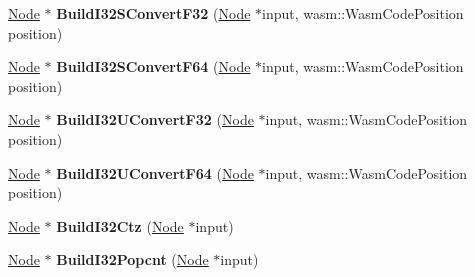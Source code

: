 \begin{DoxyCompactItemize}
\item 
\hyperlink{classv8_1_1internal_1_1compiler_1_1_node}{Node} $\ast$ {\bfseries Build\+I32\+S\+Convert\+F32} (\hyperlink{classv8_1_1internal_1_1compiler_1_1_node}{Node} $\ast$input, wasm\+::\+Wasm\+Code\+Position position)\hypertarget{classv8_1_1internal_1_1compiler_1_1_wasm_graph_builder_a4e6c3475936a02b113294ae82c132f31}{}\label{classv8_1_1internal_1_1compiler_1_1_wasm_graph_builder_a4e6c3475936a02b113294ae82c132f31}

\item 
\hyperlink{classv8_1_1internal_1_1compiler_1_1_node}{Node} $\ast$ {\bfseries Build\+I32\+S\+Convert\+F64} (\hyperlink{classv8_1_1internal_1_1compiler_1_1_node}{Node} $\ast$input, wasm\+::\+Wasm\+Code\+Position position)\hypertarget{classv8_1_1internal_1_1compiler_1_1_wasm_graph_builder_a87e2a89dddbfa00fc1c8badc940ea8a3}{}\label{classv8_1_1internal_1_1compiler_1_1_wasm_graph_builder_a87e2a89dddbfa00fc1c8badc940ea8a3}

\item 
\hyperlink{classv8_1_1internal_1_1compiler_1_1_node}{Node} $\ast$ {\bfseries Build\+I32\+U\+Convert\+F32} (\hyperlink{classv8_1_1internal_1_1compiler_1_1_node}{Node} $\ast$input, wasm\+::\+Wasm\+Code\+Position position)\hypertarget{classv8_1_1internal_1_1compiler_1_1_wasm_graph_builder_a5642d6e8c70080d6f7477f03964b7dc9}{}\label{classv8_1_1internal_1_1compiler_1_1_wasm_graph_builder_a5642d6e8c70080d6f7477f03964b7dc9}

\item 
\hyperlink{classv8_1_1internal_1_1compiler_1_1_node}{Node} $\ast$ {\bfseries Build\+I32\+U\+Convert\+F64} (\hyperlink{classv8_1_1internal_1_1compiler_1_1_node}{Node} $\ast$input, wasm\+::\+Wasm\+Code\+Position position)\hypertarget{classv8_1_1internal_1_1compiler_1_1_wasm_graph_builder_aa0dc2e3d0293f8af05674f7f227f5e30}{}\label{classv8_1_1internal_1_1compiler_1_1_wasm_graph_builder_aa0dc2e3d0293f8af05674f7f227f5e30}

\item 
\hyperlink{classv8_1_1internal_1_1compiler_1_1_node}{Node} $\ast$ {\bfseries Build\+I32\+Ctz} (\hyperlink{classv8_1_1internal_1_1compiler_1_1_node}{Node} $\ast$input)\hypertarget{classv8_1_1internal_1_1compiler_1_1_wasm_graph_builder_a55647ee3b384aac23e73e57b69e03e66}{}\label{classv8_1_1internal_1_1compiler_1_1_wasm_graph_builder_a55647ee3b384aac23e73e57b69e03e66}

\item 
\hyperlink{classv8_1_1internal_1_1compiler_1_1_node}{Node} $\ast$ {\bfseries Build\+I32\+Popcnt} (\hyperlink{classv8_1_1internal_1_1compiler_1_1_node}{Node} $\ast$input)\hypertarget{classv8_1_1internal_1_1compiler_1_1_wasm_graph_builder_a97db19f8fe8674b0e0f035597d972579}{}\label{classv8_1_1internal_1_1compiler_1_1_wasm_graph_builder_a97db19f8fe8674b0e0f035597d972579}


\end{DoxyCompactItemize}
